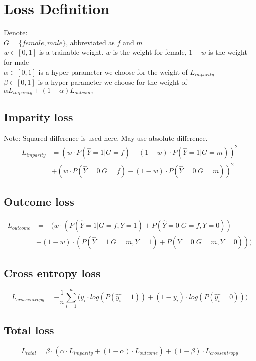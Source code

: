\documentclass{article}
\begin{document}
\section{Loss Definition}
Denote:\\
$G = \{female, male\}$, abbreviated as $f$ and $m$\\
$w \in [0, 1]$ is a trainable weight. $w$ is the weight for female, $1-w$ is the weight for male\\
$\alpha \in [0, 1]$ is a hyper parameter we choose for the weight of $L_{imparity}$\\
$\beta \in [0, 1]$ is a hyper parameter we choose for the weight of $\alpha L_{imparity} + (1-\alpha)L_{outcome}$
\subsection{Imparity loss}
Note: Squared difference is used here. May use absolute difference.
\begin{equation}\begin{split}\label{eq:imparity_loss}
L_{imparity} & = (w \cdot P(\hat{Y} = 1|G=f) - (1-w) \cdot P(\hat{Y}=1|G=m))^2\\
& + (w \cdot P(\hat{Y} = 0|G=f) - (1-w) \cdot P(\hat{Y}=0|G=m))^2
\end{split}\end{equation}
\subsection{Outcome loss}
\begin{equation}\begin{split}\label{eq:outcome_loss}
L_{outcome} & = -\bigg(w \cdot \left(P(\hat{Y} = 1|G=f, Y=1) + P(\hat{Y} = 0|G=f, Y=0)\right)\\
& + (1-w) \cdot \left(P(\hat{Y} = 1|G=m, Y=1) + P(\hat{Y} = 0|G=m, Y=0)\right) \bigg)
\end{split}\end{equation}
\subsection{Cross entropy loss}
\begin{equation}\label{eq:entropy_loss}
L_{cross entropy} = -\frac{1}{n}\sum_{i=1}^n \bigg(y_i \cdot log(P(\hat{y_i}=1)) + (1-y_i) \cdot log(P(\hat{y_i}=0))\bigg)
\end{equation}
\subsection{Total loss}
\begin{equation}\label{eq:total_loss}
L_{total} = \beta \cdot (\alpha \cdot L_{imparity} + (1-\alpha) \cdot L_{outcome}) +(1-\beta) \cdot L_{crossentropy}
\end{equation}
\end{document}
